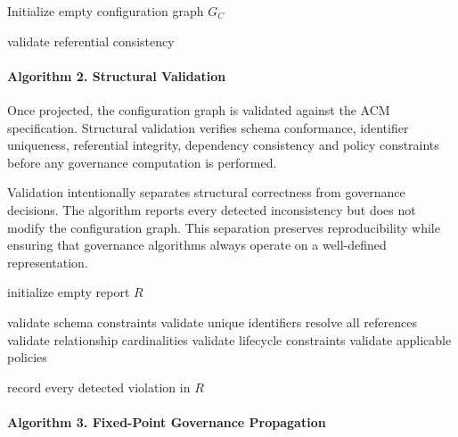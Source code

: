 \documentclass[10pt]{article}
\begin{document}
\begin{algorithm}[H]
\caption{Configuration Projection}
\label{alg:projection}

Initialize empty configuration graph $G_C$\;



validate referential consistency\;

\end{algorithm}

\paragraph{Algorithm 2. Structural Validation}

Once projected, the configuration graph is validated against the ACM specification. Structural validation verifies schema conformance, identifier uniqueness, referential integrity, dependency consistency and policy constraints before any governance computation is performed.

Validation intentionally separates structural correctness from governance decisions. The algorithm reports every detected inconsistency but does not modify the configuration graph. This separation preserves reproducibility while ensuring that governance algorithms always operate on a well-defined representation.

\begin{algorithm}[H]
\caption{Structural Validation}
\label{alg:validation}

initialize empty report $R$\;

validate schema constraints\;
validate unique identifiers\;
resolve all references\;
validate relationship cardinalities\;
validate lifecycle constraints\;
validate applicable policies\;

record every detected violation in $R$\;

\end{algorithm}

\paragraph{Algorithm 3. Fixed-Point Governance Propagation}
\end{document}
